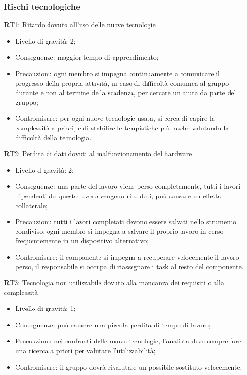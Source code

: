 \subsubsection{Rischi tecnologiche}
\textbf RT1:
 Ritardo dovuto all'uso delle nuove tecnologie
\begin{itemize}
\item Livello di gravità: 2;
\item Conseguenze: maggior tempo di apprendimento;
\item Precauzioni: ogni membro si impegna continuamente a comunicare il progresso della propria attività, in caso di difficoltà comunica al gruppo durante e non al termine della scadenza, per cercare un aiuta da parte del gruppo;
\item Contromisure: per ogni nuove tecnologie usata, si cerca di capire la complessità a priori, e di stabilire le tempistiche più lasche valutando la difficoltà della tecnologia.
\end{itemize}

\textbf RT2: 
Perdita di dati dovuti al malfunzionamento del hardware
\begin{itemize}
\item Livello d gravità: 2;
\item Conseguenze: una parte del lavoro viene perso completamente, tutti i lavori dipendenti da questo lavoro vengono ritardati, può causare un effetto collaterale;
\item Precauzioni: tutti i lavori completati devono essere salvati nello strumento condiviso, ogni membro si impegna a salvare il proprio lavoro in corso frequentemente in un dispositivo alternativo;
\item Contromisure: il componente si impegna a recuperare velocemente il lavoro perso, il responsabile si occupa di riassegnare i task al resto del componente.
\end{itemize}

\textbf RT3: 
Tecnologia non utilizzabile dovuto alla mancanza dei requisiti o alla complessità
\begin{itemize}
\item Livello di gravità: 1;
\item Conseguenze: può causere una piccola perdita di tempo di lavoro;
\item Precauzioni: nei confronti delle nuove tecnologie, l'analista deve sempre fare una ricerca a priori per valutare l'utilizzabilità;
\item Contromisure: il gruppo dovrà rivalutare un possibile sostituto velocemente.
\end{itemize}

